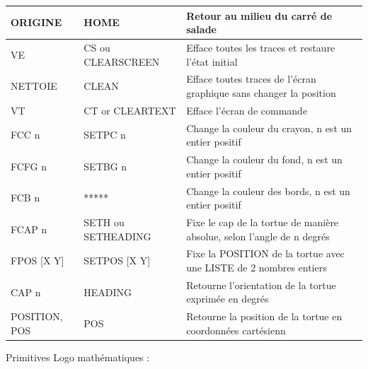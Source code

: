 \begin{table}[htb]
\begin{changemargin}{-3cm}{-3cm}
\begin{tabular}{|l|l|l|}
ORIGINE                        & HOME               & Retour au milieu du carré de salade                                                                \\ \hline
VE                             & CS ou CLEARSCREEN  & Efface toutes les traces et restaure l'état initial   \\ \hline
NETTOIE                        & CLEAN              & Efface toutes traces de l'écran graphique sans changer la position                    \\ \hline
VT                             & CT or CLEARTEXT    & Efface l'écran de commande                                                                         \\ \hline
FCC n                          & SETPC n            & Change la couleur du crayon, n est un entier positif                                               \\ \hline
FCFG n                         & SETBG n            & Change la couleur du fond, n est un entier positif                                                 \\ \hline
FCB n                          & *****              & Change la couleur des bords, n est un entier positif                                               \\ \hline
FCAP n                         & SETH ou SETHEADING & Fixe le cap de la tortue de manière absolue, selon l'angle de n degrés                             \\ \hline
FPOS {[}X Y{]}                 & SETPOS {[}X Y{]}   & Fixe la POSITION de la tortue avec une LISTE de 2 nombres entiers \\ \hline
CAP n                          & HEADING            & Retourne l'orientation de la tortue exprimée en degrés                                             \\ \hline
POSITION, POS                  & POS                & Retourne la position de la tortue en coordonnées cartésienn                                        \\ \hline
\end{tabular}
\end{changemargin}
\end{table}

\newpage 

Primitives Logo mathématiques :

